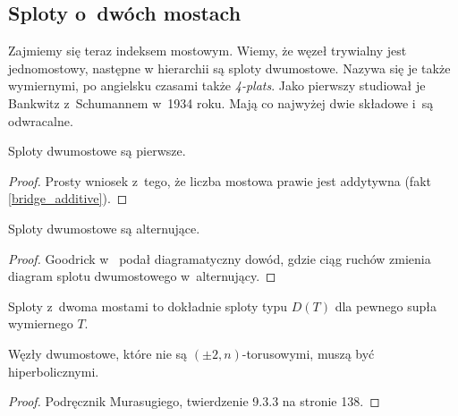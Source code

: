 \subsection{Sploty o~dwóch mostach} %
\label{sub:twobridge}


Zajmiemy się teraz indeksem mostowym.
Wiemy, że węzeł trywialny jest jednomostowy, następne w hierarchii są sploty dwumostowe.
Nazywa się je także wymiernymi, po angielsku czasami także \emph{4-plats}.
Jako pierwszy studiował je Bankwitz z~Schumannem w~1934 roku.
Mają co najwyżej dwie składowe i~są odwracalne.

\begin{proposition}
    Sploty dwumostowe są pierwsze.
\end{proposition}

\begin{proof}
    Prosty wniosek z~tego, że liczba mostowa prawie jest addytywna (fakt \ref{bridge_additive}).
\end{proof}

\begin{proposition}
    Sploty dwumostowe są alternujące.
\end{proposition}

\begin{proof}
    Goodrick w~\cite{goodrick72} podał diagramatyczny dowód, gdzie ciąg ruchów zmienia diagram splotu dwumostowego w~alternujący.
\end{proof}

\begin{proposition}
\label{prp:two_bridge_tangle}
    Sploty z~dwoma mostami to dokładnie sploty typu $D(T)$ dla pewnego supła wymiernego $T$.
\end{proposition}

\begin{proposition}
\label{prp:two_bridge_hyperbolic}
    Węzły dwumostowe, które nie są $(\pm 2, n)$-torusowymi, muszą być hiperbolicznymi.
\end{proposition}

\begin{proof}
    Podręcznik \cite{murasugi96} Murasugiego, twierdzenie 9.3.3 na stronie 138.
\end{proof}


